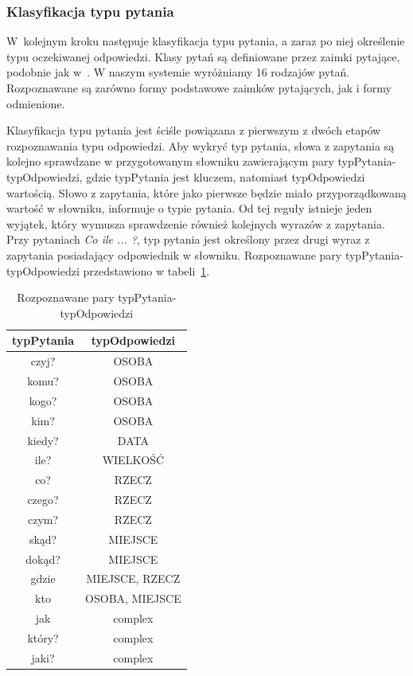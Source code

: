\subsubsection{Klasyfikacja typu pytania}
W~kolejnym kroku następuje klasyfikacja typu pytania, a zaraz po niej określenie typu oczekiwanej odpowiedzi. Klasy pytań są definiowane przez zaimki pytające, podobnie jak w~\cite{gupta2012survey}. W naszym systemie wyróżniamy 16 rodzajów pytań. Rozpoznawane są zarówno formy podstawowe zaimków pytających, jak i formy odmienione.

Klasyfikacja typu pytania jest ściśle powiązana z pierwszym z dwóch etapów rozpoznawania typu odpowiedzi. Aby wykryć typ pytania, słowa z zapytania są kolejno sprawdzane w przygotowanym słowniku zawierającym pary typPytania-typOdpowiedzi, gdzie typPytania jest kluczem, natomiast typOdpowiedzi wartością. Słowo z zapytania, które jako pierwsze będzie miało przyporządkowaną wartość w słowniku, informuje o typie pytania. Od tej reguły istnieje jeden wyjątek, który wymusza sprawdzenie również kolejnych wyrazów z zapytania. Przy pytaniach \emph{Co ile ... ?}, typ pytania jest określony przez drugi wyraz z zapytania posiadający odpowiednik w słowniku. Rozpoznawane pary typPytania-typOdpowiedzi przedstawiono w tabeli~\ref{tab:tabelaPytOdp}.

\begin{table}[h]
	\centering
	\begin{tabular}{|c|c| }
		
		 \hline
		\textbf{typPytania} & \textbf{typOdpowiedzi}  \\ \hline
		czyj? & OSOBA \\  \hline
		komu? & OSOBA \\ \hline
		kogo? & OSOBA \\ \hline
		kim? & OSOBA \\ \hline
		kiedy? & DATA \\  \hline
		ile? & WIELKOŚĆ \\  \hline
		co? & RZECZ \\  \hline
		czego? & RZECZ \\ \hline
		czym? & RZECZ \\ \hline
		skąd? & MIEJSCE \\ \hline
		dokąd? & MIEJSCE \\ \hline
		gdzie & MIEJSCE, RZECZ \\ \hline
		kto & OSOBA, MIEJSCE \\ \hline
		jak & complex \\ \hline
		który? & complex \\ \hline
		jaki? & complex  \\  \hline
	\end{tabular}
	\caption{Rozpoznawane pary typPytania-typOdpowiedzi}

\label{tab:tabelaPytOdp}

\end{table}

